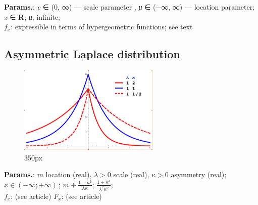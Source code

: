     {\color{darkblue} \textbf{Params.}:} {\textit{c} ∈ (0, ∞) — scale parameter , 
\textit{μ} ∈ (−∞, ∞) — location parameter}; {\textit{x} ∈ \textbf{R}}; {\textit{μ}}; {infinite};\hspace{0.5cm}\\{\color{darkblue} \textbf{$f_x$}:} {expressible in terms of hypergeometric functions; see text}



    
        
\subsection{Asymmetric Laplace distribution}


    \begin{figure}[H]
        \centering
        \includegraphics[width=0.6\textwidth]{images/AsymmetricLaplace.jpg}
        \caption{350px}
    \end{figure}




    {\color{darkblue} \textbf{Params.}:} {$m$ location (real),  $\lambda > 0$ scale (real),  $\kappa > 0$ asymmetry (real)}; {$x \in (-\infty; +\infty)\,$}; {$m+\frac{1-\kappa^2}{\lambda\kappa}$}; {$\frac{1+\kappa^4}{\lambda^2\kappa^2}$};\hspace{0.5cm}\\{\color{darkblue} \textbf{$f_x$}:} {(see article)}{\color{darkblue} \textbf{$F_x$}:} {(see article)}



